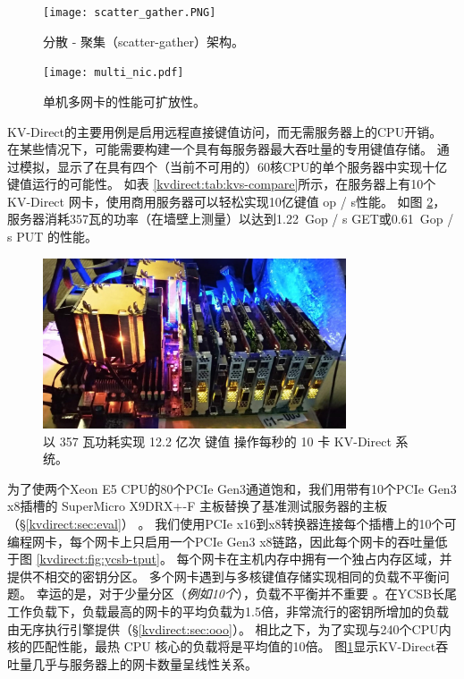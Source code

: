 \begin{figure}[t]
\begin{minipage}[t]{0.5\textwidth}
\centering
\texttt{[image: scatter\_gather.PNG]}
\caption{分散 - 聚集（scatter-gather）架构。}
\label{kvdirect:fig:sg-arch}
\end{minipage}
\begin{minipage}[t]{0.5\textwidth}
\centering
\texttt{[image: multi\_nic.pdf]}
\caption{单机多网卡的性能可扩放性。}
\label{kvdirect:fig:multiple-nics}
\end{minipage}

\end{figure}

KV-Direct的主要用例是启用远程直接键值访问，而无需服务器上的CPU开销。
在某些情况下，可能需要构建一个具有每服务器最大吞吐量的专用键值存储。
通过模拟，\cite {li2016full}显示了在具有四个（当前不可用的）60核CPU的单个服务器中实现十亿键值运行的可能性。
如表 \ref{kvdirect:tab:kvs-compare}所示，在服务器上有10个KV-Direct 网卡，使用商用服务器可以轻松实现10亿键值 op / s性能。
如图 \ref{kvdirect:fig:photo}，服务器消耗357瓦的功率（在墙壁上测量）以达到1.22~Gop / s GET或0.61~Gop / s PUT 的性能。


\begin{figure}[htbp]
	\centering
	\includegraphics[width=0.8\textwidth]{figure/kvdirect_photo.jpg}
	\caption{以 357 瓦功耗实现 12.2 亿次 键值 操作每秒的 10 卡 KV-Direct 系统。}
	\label{kvdirect:fig:photo}
\end{figure}

为了使两个Xeon E5 CPU的80个PCIe Gen3通道饱和，我们用带有10个PCIe Gen3 x8插槽的 SuperMicro X9DRX+-F 主板替换了基准测试服务器的主板（\S\ref {kvdirect:sec:eval}） 。
我们使用PCIe x16到x8转换器连接每个插槽上的10个可编程网卡，每个网卡上只启用一个PCIe Gen3 x8链路，因此每个网卡的吞吐量低于图 \ref {kvdirect:fig:ycsb-tput}。
每个网卡在主机内存中拥有一个独占内存区域，并提供不相交的密钥分区。
多个网卡遇到与多核键值存储实现相同的负载不平衡问题。
幸运的是，对于少量分区（\textit {例如10个}），负载不平衡并不重要 \cite {lim2014mica,li2016full}。在YCSB长尾工作负载下，负载最高的网卡的平均负载为1.5倍，非常流行的密钥所增加的负载由无序执行引擎提供（\S \ref {kvdirect:sec:ooo}）。
相比之下，为了实现与240个CPU内核的匹配性能，最热 CPU 核心的负载将是平均值的10倍。
图\ref {kvdirect:fig:multiple-nics}显示KV-Direct吞吐量几乎与服务器上的网卡数量呈线性关系。

